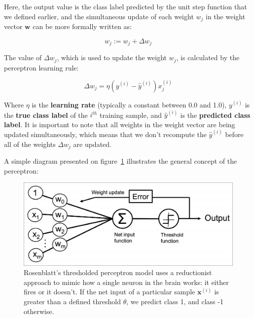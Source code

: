 \documentclass[11pt]{article}
\newcommand{\vect}[1]{\boldsymbol{#1}}
\begin{document}
    Here, the output value is the class label predicted by the unit step function that we defined earlier, and the simultaneous update of each weight $w_j$ in the weight vector $\vect{w}$ can be more formally written as:

    \begin{equation}
        \label{eq:weight_update}
        w_j := w_j + \Delta w_j
    \end{equation}

    The value of $\Delta w_j$, which is used to update the weight $w_j$, is calculated by the perceptron learning rule:

    \begin{equation}
        \label{eq:perc_learn_rule}
        \Delta w_j = \eta \left( y^{(i)} - \hat{y}^{(i)} \right) x_j^{(i)}
    \end{equation}

    Where $\eta$ is the \textbf{learning rate} (typically a constant between 0.0 and 1.0), $y^{(i)}$ is the \textbf{true class label} of the $i^{th}$ training sample, and $\hat{y}^{(i)}$ is the \textbf{predicted class label}.
    It is important to note that all weights in the weight vector are being updated simultaneously, which means that we don't recompute the $\hat{y}^{(i)}$ before all of the weights $\Delta w_j$ are updated.

    A simple diagram presented on figure~\ref{fig:perceptron_dag} illustrates the general concept of the perceptron:
    \begin{figure}[hbt!]
        \centering
        \includegraphics[width=1\linewidth,trim=4 4 4 4,clip]{img/perceptron_dag.jpg}
        \caption{Rosenblatt's thresholded perceptron model uses a reductionist approach to mimic how a single neuron in the brain works: it either fires or it doesn't.
        If the net input of a particular sample $\vect{x}^{(i)}$ is greater than a defined threshold $\theta$, we predict class 1, and class -1 otherwise.}
        \label{fig:perceptron_dag}
    \end{figure}
\end{document}
